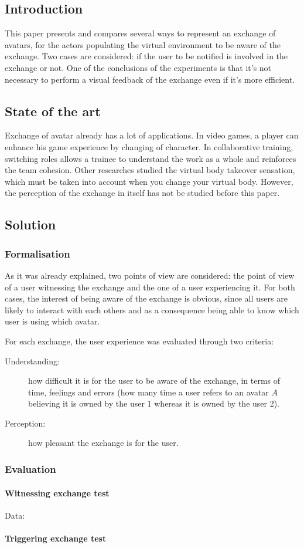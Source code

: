 \documentclass[a4paper]{article}
\begin{document}
\subsection{Introduction}

This paper presents and compares several ways to represent an exchange of avatars, for the actors populating the virtual environment to be aware of the exchange. Two cases are considered: if the user to be notified is involved in the exchange or not. One of the conclusions of the experiments is that it's not necessary to perform a visual feedback of the exchange even if it's more efficient.

\subsection{State of the art}

Exchange of avatar already has a lot of applications. In video games, a player can enhance his game experience by changing of character. In collaborative training, switching roles allows a trainee to understand the work as a whole and reinforces the team cohesion. Other researches studied the virtual body takeover sensation, which must be taken into account when you change your virtual body. However, the perception of the exchange in itself has not be studied before this paper.

\subsection{Solution}

\subsubsection{Formalisation}
As it was already explained, two points of view are considered: the point of view of a user witnessing the exchange and the one of a user experiencing it. For both cases, the interest of being aware of the exchange is obvious, since all users are likely to interact with each others and as a consequence being able to know which user is using which avatar.

For each exchange, the user experience was evaluated through two criteria:
\begin{description}
	\item[Understanding:] how difficult it is for the user to be aware of the exchange, in terms of time, feelings and errors (how many time a user refers to an avatar $A$ believing it is owned by the user 1 whereas it is owned by the user 2).
	\item[Perception:] how pleasant the exchange is for the user.
\end{description}

\subsubsection{Evaluation}

\paragraph{Witnessing exchange test}
\begin{description}
	\item[Data:] 
\end{description}

\paragraph{Triggering exchange test}
\end{document}
